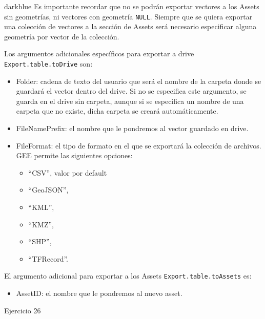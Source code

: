 \documentclass[
  12pt,
  letterpaper,
  twoside]{book}
\providecommand{\tightlist}{%
  \setlength{\itemsep}{0pt}\setlength{\parskip}{0pt}}
\begin{document}
\begin{bluebox2}

\begin{awesomeblock}{5pt}{\faLightbulb}{darkblue}
Es importante recordar que no se podrán exportar vectores a los Assets sin geometrías, ni vectores con geometría \texttt{NULL}. Siempre que se quiera exportar una colección de vectores a la sección de Assets será necesario especificar alguna geometría por vector de la colección.

\end{awesomeblock}

\end{bluebox2}

Los argumentos adicionales específicos para exportar a drive \texttt{Export.table.toDrive} son:

\begin{itemize}
\item
  Folder: cadena de texto del usuario que será el nombre de la carpeta donde se guardará el vector dentro del drive. Si no se especifica este argumento, se guarda en el drive sin carpeta, aunque si se especifica un nombre de una carpeta que no existe, dicha carpeta se creará automáticamente.
\item
  FileNamePrefix: el nombre que le pondremos al vector guardado en drive.
\item
  FileFormat: el tipo de formato en el que se exportará la colección de archivos. GEE permite las siguientes opciones:

  \begin{itemize}
  \tightlist
  \item
    ``CSV'', valor por default
  \item
    ``GeoJSON'',
  \item
    ``KML'',
  \item
    ``KMZ'',
  \item
    ``SHP'',
  \item
    ``TFRecord''.
  \end{itemize}
\end{itemize}

El argumento adicional para exportar a los Assets \texttt{Export.table.toAssets} es:

\begin{itemize}
\tightlist
\item
  AssetID: el nombre que le pondremos al nuevo asset.
\end{itemize}

Ejercicio 26
\end{document}
